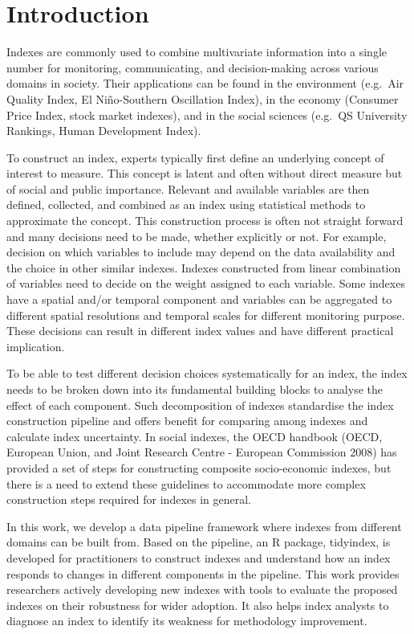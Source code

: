 \documentclass[
]{interact}
\begin{document}
\hypertarget{introduction}{%
\section{Introduction}\label{introduction}}

Indexes are commonly used to combine multivariate information into a
single number for monitoring, communicating, and decision-making across
various domains in society. Their applications can be found in the
environment (e.g.~Air Quality Index, El Niño-Southern Oscillation
Index), in the economy (Consumer Price Index, stock market indexes), and
in the social sciences (e.g.~QS University Rankings, Human Development
Index).

To construct an index, experts typically first define an underlying
concept of interest to measure. This concept is latent and often without
direct measure but of social and public importance. Relevant and
available variables are then defined, collected, and combined as an
index using statistical methods to approximate the concept. This
construction process is often not straight forward and many decisions
need to be made, whether explicitly or not. For example, decision on
which variables to include may depend on the data availability and the
choice in other similar indexes. Indexes constructed from linear
combination of variables need to decide on the weight assigned to each
variable. Some indexes have a spatial and/or temporal component and
variables can be aggregated to different spatial resolutions and
temporal scales for different monitoring purpose. These decisions can
result in different index values and have different practical
implication.

To be able to test different decision choices systematically for an
index, the index needs to be broken down into its fundamental building
blocks to analyse the effect of each component. Such decomposition of
indexes standardise the index construction pipeline and offers benefit
for comparing among indexes and calculate index uncertainty. In social
indexes, the OECD handbook (OECD, European Union, and Joint Research
Centre - European Commission 2008) has provided a set of steps for
constructing composite socio-economic indexes, but there is a need to
extend these guidelines to accommodate more complex construction steps
required for indexes in general.

In this work, we develop a data pipeline framework where indexes from
different domains can be built from. Based on the pipeline, an R
package, tidyindex, is developed for practitioners to construct indexes
and understand how an index responds to changes in different components
in the pipeline. This work provides researchers actively developing new
indexes with tools to evaluate the proposed indexes on their robustness
for wider adoption. It also helps index analysts to diagnose an index to
identify its weakness for methodology improvement.
\end{document}
